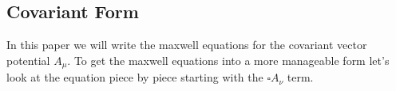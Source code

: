 \documentclass[12pt]{article}
\begin{document}
\subsection{Covariant Form}
In this paper we will write the maxwell equations for the covariant vector potential $A_{\mu}$. To get the maxwell equations into a more manageable form let's look at the equation piece by piece starting with the $\square A_{\nu}$ term. 
\end{document}
